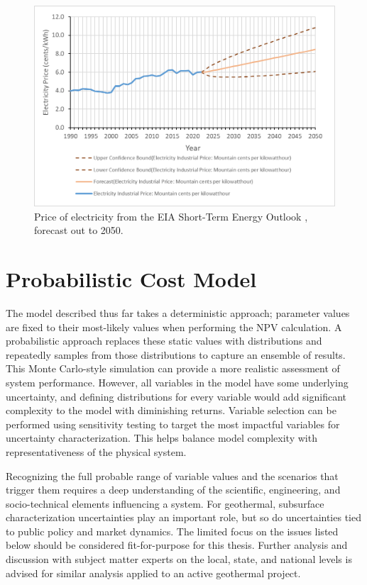 \begin{figure}[!htp]
\centering
\includegraphics[width=.8\textwidth]{templates/images/Figure-EIA_Electricity_Forecast.png}
\caption[Electricity price forecast]{Price of electricity from the EIA Short-Term Energy Outlook \protect\citep{eia_short-term_2021}, forecast out to 2050.}
\label{fig:electricity_pricing}
\end{figure}

\section{Probabilistic Cost Model}\label{ch4:cm_uncertainties}
The model described thus far takes a deterministic approach; parameter values are fixed to their most-likely values when performing the NPV calculation. A probabilistic approach replaces these static values with distributions and repeatedly samples from those distributions to capture an ensemble of results. This Monte Carlo-style simulation can provide a more realistic assessment of system performance. However, all variables in the model have some underlying uncertainty, and defining distributions for every variable would add significant complexity to the model with diminishing returns. Variable selection can be performed using sensitivity testing to target the most impactful variables for uncertainty characterization. This helps balance model complexity with representativeness of the physical system. 

Recognizing the full probable range of variable values and the scenarios that trigger them requires a deep understanding of the scientific, engineering, and socio-technical elements influencing a system. For geothermal, subsurface characterization uncertainties play an important role, but so do uncertainties tied to public policy and market dynamics. The limited focus on the issues listed below should be considered fit-for-purpose for this thesis. Further analysis and discussion with subject matter experts on the local, state, and national levels is advised for similar analysis applied to an active geothermal project.

